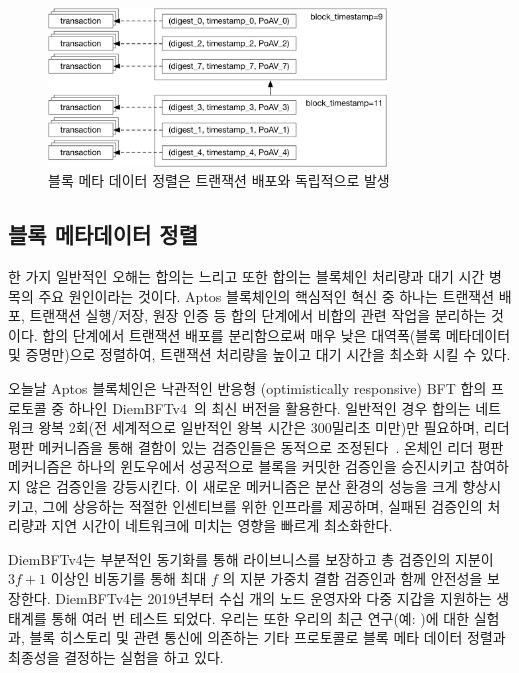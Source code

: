 \documentclass{article}
\begin{document}
\begin{figure}
\centering
\includegraphics[width=0.8\textwidth]{ordering.pdf}
\caption{\label{fig:block}블록 메타 데이터 정렬은 트랜잭션 배포와 독립적으로 발생}
\end{figure}

\subsection{블록 메타데이터 정렬}
\label{subsec:block_metadata_ordering}

한 가지 일반적인 오해는 합의는 느리고 또한 합의는 블록체인 처리량과 대기 시간 병목의 주요 원인이라는 것이다. Aptos 블록체인의 핵심적인 혁신 중 하나는 트랜잭션 배포, 트랜잭션 실행/저장, 원장 인증 등 합의 단계에서 비합의 관련 작업을 분리하는 것이다. 합의 단계에서 트랜잭션 배포를 분리함으로써 매우 낮은 대역폭(블록 메타데이터 및 증명만)으로 정렬하여, 트랜잭션 처리량을 높이고 대기 시간을 최소화 시킬 수 있다.

오늘날 Aptos 블록체인은 낙관적인 반응형 (optimistically responsive) BFT 합의 프로토콜 중 하나인 DiemBFTv4~\cite{diembft_v4}의 최신 버전을 활용한다. 일반적인 경우 합의는 네트워크 왕복 2회(전 세계적으로 일반적인 왕복 시간은 300밀리초 미만)만 필요하며, 리더 평판 메커니즘을 통해 결함이 있는 검증인들은 동적으로 조정된다~\cite{be_aware}. 온체인 리더 평판 메커니즘은 하나의 윈도우에서 성공적으로 블록을 커밋한 검증인을 승진시키고 참여하지 않은 검증인을 강등시킨다. 이 새로운 메커니즘은 분산 환경의 성능을 크게 향상시키고, 그에 상응하는 적절한 인센티브를 위한 인프라를 제공하며, 실패된 검증인의 처리량과 지연 시간이 네트워크에 미치는 영향을 빠르게 최소화한다.

DiemBFTv4는 부분적인 동기화를 통해 라이브니스를 보장하고 총 검증인의 지분이 $3f +1$ 이상인 비동기를 통해 최대 $f$ 의 지분 가중치 결함 검증인과 함께 안전성을 보장한다. DiemBFTv4는 2019년부터 수십 개의 노드 운영자와 다중 지갑을 지원하는 생태계를 통해 여러 번 테스트 되었다. 우리는 또한 우리의 최근 연구(예: \cite{bullshark})에 대한 실험과, 블록 히스토리 및 관련 통신에 의존하는 기타 프로토콜로 블록 메타 데이터 정렬과 최종성을 결정하는 실험을 하고 있다.
\end{document}
